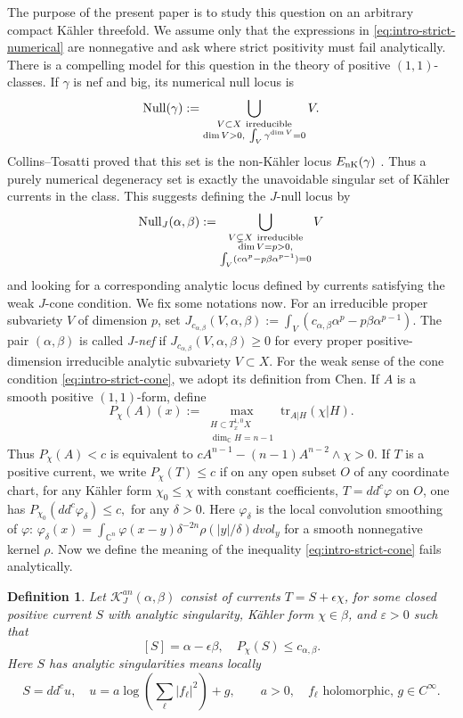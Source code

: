\documentclass[reqno]{amsart}
\theoremstyle{remark}
\def\C{\mathbb{C}}
\def\tr{\text{tr}}
\newcommand{\ddc}{dd^c}
\newcommand{\JNull}{\operatorname{Null}_{J}}
\newcommand{\cab}{c_{\alpha,\beta}}
\def\cK{{\mathcal K}}
\theoremstyle{plain}
\newtheorem{defn}[thm]{Definition}
\begin{document}
The purpose of the present paper is to study this question on an
arbitrary compact K\"ahler threefold.  We assume only that the
expressions in \eqref{eq:intro-strict-numerical} are nonnegative and
ask where strict positivity must fail analytically. There is a compelling model for this question in the theory of
positive $(1,1)$-classes.  If $\gamma$ is nef and big, its numerical
null locus is
\[
 \operatorname{Null}(\gamma)
 :=\bigcup_{\substack{V\subset X\ {\rm irreducible}\\
                       \dim V>0,\ 
                       \int_V\gamma^{\dim V}=0}}V.
\]
Collins--Tosatti proved that this set is the non-K\"ahler locus
$E_{\rm nK}(\gamma)$ \cite[Theorem~1.1]{CT15}.  Thus a
purely numerical degeneracy set is exactly the unavoidable singular
set of K\"ahler currents in the class.  This suggests defining the
$J$-null locus by
\[
 \JNull(\alpha,\beta)
 :=\bigcup_{\substack{V\subsetneq X\ {\rm irreducible}\\
                       \dim V=p>0,\\
  \int_V(c\alpha^p-p\beta\alpha^{p-1})=0}}V
\]
and looking for a corresponding analytic locus defined by currents
satisfying the weak $J$-cone condition. We fix some notations now. For an irreducible proper subvariety $V$ of dimension $p$, set $J_{\cab}(V,\alpha,\beta):=\int_V (\cab\alpha^p-p\beta\alpha^{p-1})$. 
The pair $(\alpha,\beta)$ is called \emph{ J-nef} if $ J_{c_{\alpha,\beta}}(V,\alpha,\beta)\geq 0$ for every proper positive-dimension irreducible analytic subvariety $V\subset X$. For the weak sense of the cone condition \eqref{eq:intro-strict-cone},
we adopt its definition from Chen\cite[Definition 3.3]{C21}. If $A$ is a smooth positive $(1,1)$-form, define
\[
 P_\chi(A)(x)
 :=\max_{\substack{H\subset T_x^{1,0}X\\ \dim_{\mathbb C}H=n-1}}
        \tr_{A|H}(\chi|H).
\]
Thus $P_\chi(A)<c$ is equivalent to $cA^{n-1}-(n-1)A^{n-2}\wedge \chi>0$. If $T$ is a positive current, we write $P_\chi(T)\leq c$ if on any open subset $O$ of any coordinate chart, for any K\"ahler form $\chi_0\leq \chi$ with constant coefficients, $T=\ddc\varphi$ on $O$, one has $P_{\chi_0}(\ddc\varphi_\delta)\leq c,$ for any $\delta>0$.  Here $\varphi_\delta$ is the local convolution smoothing of $\varphi$: $\varphi
   _\delta(x)=\int_{\C^n}\varphi(x-y)\delta^{-2n}\rho(|y|/\delta)dvol_y$ for a smooth nonnegative kernel $\rho$. Now we define the meaning of the inequality \eqref{eq:intro-strict-cone} fails analytically. 
\begin{defn}
    Let $\cK_J^{an}(\alpha,\beta)$ consist of currents $T=S+\epsilon \chi$, for some closed positive current $S$ with analytic singularity,  K\"ahler form $\chi\in \beta$, and $\varepsilon>0$ such that 
\[[S]=\alpha-\epsilon\beta, \quad P_\chi(S)\leq c_{\alpha,\beta}.
    \]
  Here $S$ has analytic singularities means  locally \[
    S=\ddc u, \quad u=a\log\left(\sum_{\ell}|f_\ell|^2\right)+g,
 \qquad a>0,\quad f_\ell \text{ holomorphic, } g\in C^\infty.
    \]
\end{defn}
\end{document}
